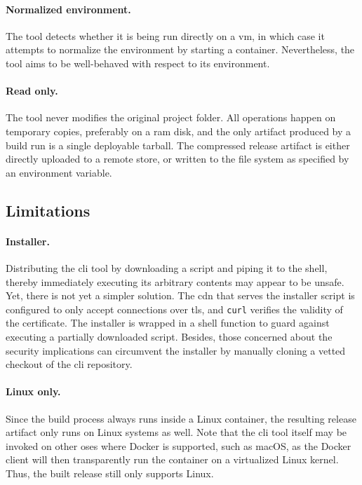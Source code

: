 \paragraph{Normalized environment.} The tool detects whether it is being run directly on a \acrshort{vm}, in which case it attempts to normalize the environment by starting a container. Nevertheless, the tool aims to be well-behaved with respect to its environment.

\paragraph{Read only.} The tool never modifies the original project folder. All operations happen on temporary copies, preferably on a \acrshort{ram} disk, and the only artifact produced by a build run is a single deployable tarball. The compressed release artifact is either directly uploaded to a remote store, or written to the file system as specified by an environment variable.


\cleardoublepage
\subsection{Limitations}

\paragraph{Installer.}\label{sec:curlpipesh} Distributing the \acrshort{cli} tool by downloading a script and piping it to the shell, thereby immediately executing its arbitrary contents may appear to be unsafe. Yet, there is not yet a simpler solution. The \acrshort{cdn} that serves the installer script is configured to only accept connections over \acrshort{tls}, and \lstinline|curl| verifies the validity of the certificate. The installer is wrapped in a shell function to guard against executing a partially downloaded script. Besides, those concerned about the security implications can circumvent the installer by manually cloning a vetted checkout of the \acrshort{cli} repository.

\paragraph{Linux only.} Since the build process always runs inside a Linux container, the resulting release artifact only runs on Linux systems as well. Note that the \acrshort{cli} tool itself may be invoked on other \acrshort{os}es where Docker is supported, such as macOS, as the Docker client will then transparently run the container on a virtualized Linux kernel. Thus, the built release still only supports Linux.

